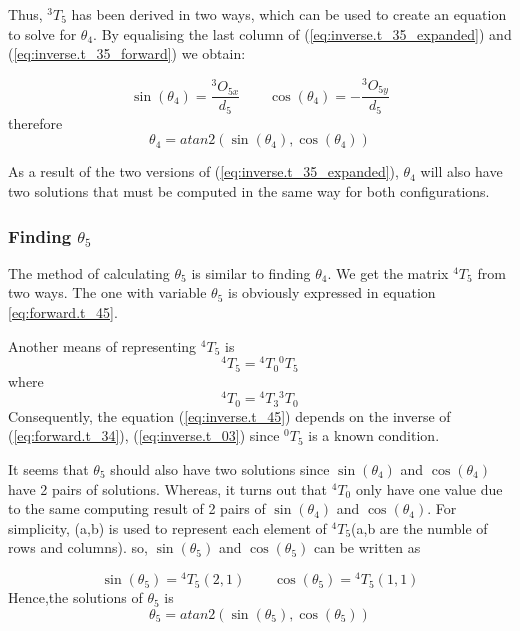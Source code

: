 \documentclass{article}
\renewcommand{\c}[1]{\cos(\theta_{#1})}
\newcommand{\s}[1]{\sin(\theta_{#1})}
\newcommand{\T}[2]{{}^{#1}T_{#2}}
\renewcommand{\O}[2]{{}^{#1}O_{#2}}
\begin{document}
Thus, $\T{3}{5}$ has been derived in two ways, which can be used to create an equation to solve for $\theta_4$. By equalising the last column of (\ref{eq:inverse.t_35_expanded}) and (\ref{eq:inverse.t_35_forward}) we obtain:

\begin{equation}
\s{4} = \frac{\O{3}{5x}}{d_5}
\qquad
\c{4} = -\frac{\O{3}{5y}}{d_5}
\end{equation}
therefore
\begin{equation}
\theta_{4} = atan2(\s{4},\c{4})
\end{equation}

As a result of the two versions of (\ref{eq:inverse.t_35_expanded}), $\theta_4$ will also have two solutions that must be computed in the same way for both configurations.

\subsubsection{Finding $\theta_5$}
The method of calculating $\theta_5$ is similar to finding $\theta_4$. We get the matrix  $\T{4}{5}$ from two ways. The one with variable $\theta_5$ is obviously expressed in equation \ref{eq:forward.t_45}.

Another means of representing $\T{4}{5}$ is 
\begin{equation}
\label{eq:inverse.t_45}
\T{4}{5} = \T{4}{0} \T{0}{5}
\end{equation}
where
\begin{equation*}
\T{4}{0} = \T{4}{3}\T{3}{0}
\end{equation*}
Consequently, the equation (\ref{eq:inverse.t_45}) depends on the inverse of (\ref{eq:forward.t_34}), (\ref{eq:inverse.t_03}) since $\T{0}{5}$ is a known condition. 

It seems that $\theta_5$ should also have two solutions since $\s{4}$ and $\c{4}$ have 2 pairs of solutions. Whereas, it turns out that $\T{4}{0}$ only have one value due to the same computing result of 2 pairs of $\s{4}$ and $\c{4}$. For simplicity, (a,b) is used to represent each element of $\T{4}{5}$(a,b are the numble of rows and columns). so, $\s{5}$ and $\c{5}$ can be written as

\begin{equation}
\s{5} = \T{4}{5}(2,1)
\qquad
\c{5} = \T{4}{5}(1,1)
\end{equation}
Hence,the solutions of $\theta_5$ is
\begin{equation}
\theta_{5} = atan2(\s{5},\c{5})
\end{equation}
\end{document}
